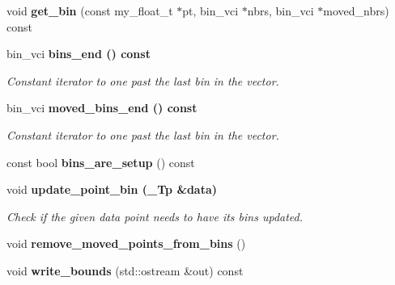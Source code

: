 \begin{CompactItemize}
\item 
void \textbf{get\_\-bin} (const my\_\-float\_\-t $\ast$pt, bin\_\-vci $\ast$nbrs, bin\_\-vci $\ast$moved\_\-nbrs) const \label{classSimSite3D_1_1point__bins_3efe4ebd6c36993e1be9802c8edf1c35}

\item 
bin\_\-vci \bf{bins\_\-end} () const \label{classSimSite3D_1_1point__bins_f9c9f7b5c7be74b76b0eba306879324d}

\begin{CompactList}\small\item\em Constant iterator to one past the last bin in the vector. \item\end{CompactList}\item 
bin\_\-vci \bf{moved\_\-bins\_\-end} () const \label{classSimSite3D_1_1point__bins_54a580e492ce7205e0bc5fc58f4bf26a}

\begin{CompactList}\small\item\em Constant iterator to one past the last bin in the vector. \item\end{CompactList}\item 
const bool \textbf{bins\_\-are\_\-setup} () const \label{classSimSite3D_1_1point__bins_c748633d67a3d339c7a895b43666aec1}

\item 
void \bf{update\_\-point\_\-bin} (\_\-Tp \&data)\label{classSimSite3D_1_1point__bins_e07134e8f4497da13dd6136bcb45602e}

\begin{CompactList}\small\item\em Check if the given data point needs to have its bins updated. \item\end{CompactList}\item 
void \textbf{remove\_\-moved\_\-points\_\-from\_\-bins} ()\label{classSimSite3D_1_1point__bins_5729496a671be351b0826b5452770e06}

\item 
void \textbf{write\_\-bounds} (std::ostream \&out) const \label{classSimSite3D_1_1point__bins_701b0831628d6b9e7e2b878da1488bd6}

\end{CompactItemize}
